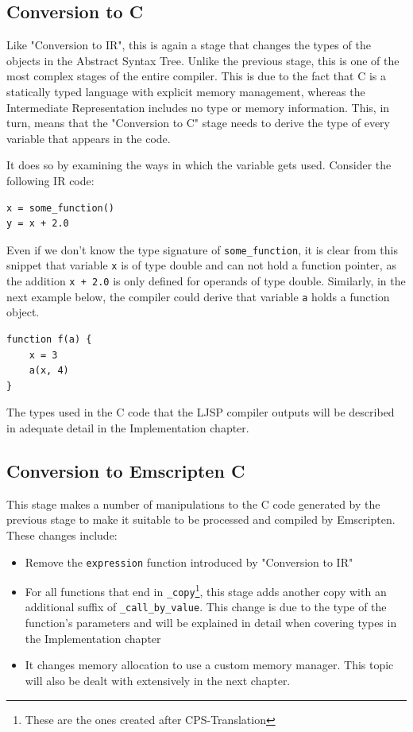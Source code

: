 \documentclass[11pt]{report}
\begin{document}
\subsection{Conversion to C}
Like "Conversion to IR", this is again a stage that changes the types of the objects in the Abstract Syntax Tree. Unlike the previous stage, this is one of the most complex stages of the entire compiler. This is due to the fact that C is a statically typed language with explicit memory management, whereas the Intermediate Representation includes no type or memory information. This, in turn, means that the "Conversion to C" stage needs to derive the type of every variable that appears in the code.

It does so by examining the ways in which the variable gets used. Consider the following IR code:
\begin{lstlisting}
x = some_function()
y = x + 2.0
\end{lstlisting}

Even if we don't know the type signature of \texttt{some_function}, it is clear from this snippet that variable \texttt{x} is of type double and can not hold a function pointer, as the addition \texttt{x + 2.0} is only defined for operands of type double. Similarly, in the next example below, the compiler could derive that variable \texttt{a} holds a function object.
\begin{lstlisting}
function f(a) {
    x = 3
    a(x, 4)
}
\end{lstlisting}

The types used in the C code that the LJSP compiler outputs will be described in adequate detail in the Implementation chapter.

\subsection{Conversion to Emscripten C}
This stage makes a number of manipulations to the C code generated by the previous stage to make it suitable to be processed and compiled by Emscripten. These changes include:
\begin{itemize}
\item Remove the \texttt{expression} function introduced by "Conversion to IR"
\item For all functions that end in \texttt{_copy}\footnote{These are the ones created after CPS-Translation}, this stage adds another copy with an additional suffix of \texttt{_call_by_value}. This change is due to the type of the function's parameters and will be explained in detail when covering types in the Implementation chapter
\item It changes memory allocation to use a custom memory manager. This topic will also be dealt with extensively in the next chapter.
\end{itemize}
\end{document}
